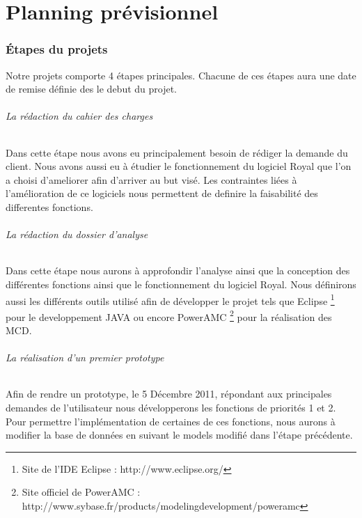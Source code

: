 \part{Planning prévisionnel}

\section{Étapes du projets}

Notre projets comporte 4 étapes principales. Chacune de ces étapes aura une date de remise définie des le debut du projet. 

\paragraph{La rédaction du cahier des charges}

Dans cette étape nous avons eu principalement besoin de rédiger la demande du client. 
Nous avons aussi eu à étudier le fonctionnement du logiciel Royal que l'on a choisi d'ameliorer afin d'arriver au but visé.
Les contraintes liées à l'amélioration de ce logiciels nous permettent de definire la faisabilité des differentes fonctions. 

\paragraph{La rédaction du dossier d'analyse}

Dans cette étape nous aurons à approfondir l'analyse ainsi que la conception des différentes fonctions ainsi que le fonctionnement du logiciel Royal. 
Nous définirons aussi les différents outils utilisé afin de développer le projet tels que 
Eclipse \footnote{Site de l'IDE Eclipse : http://www.eclipse.org/} 
pour le developpement JAVA ou encore 
PowerAMC \footnote{Site officiel de PowerAMC : http://www.sybase.fr/products/modelingdevelopment/poweramc}
pour la réalisation des MCD.

\paragraph{La réalisation d'un premier prototype}

Afin de rendre un prototype, le 5 Décembre 2011, répondant aux principales demandes de l'utilisateur nous développerons les fonctions de priorités 1 et 2.
Pour permettre l'implémentation de certaines de ces fonctions, nous aurons à modifier la base de données en suivant le models modifié dans l'étape précédente.  

